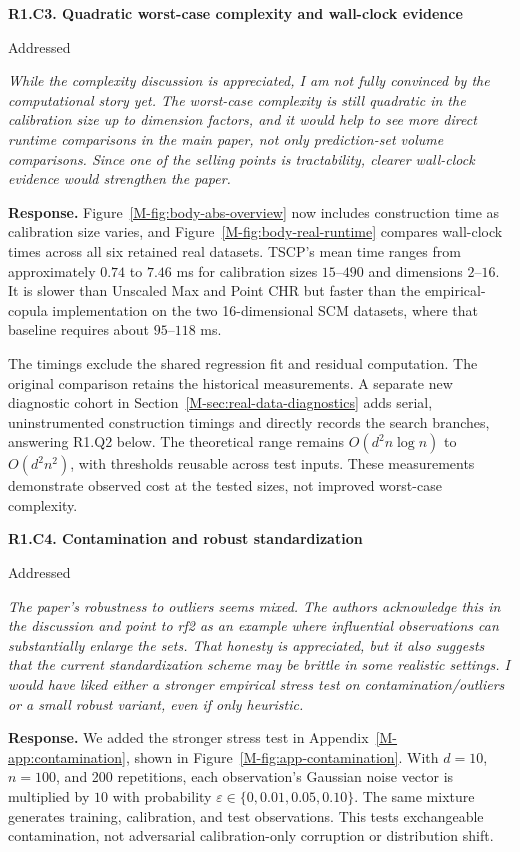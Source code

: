 \documentclass[11pt]{article}
\newcommand{\mssec}[1]{Section~\ref*{M-#1}}
\newcommand{\msapp}[1]{Appendix~\ref*{M-#1}}
\newcommand{\msfig}[1]{Figure~\ref*{M-#1}}
\newcommand{\point}[3]{\par\Needspace{7\baselineskip}\medskip
\noindent\parbox[t]{0.77\linewidth}{\textbf{#1}}\hfill
\parbox[t]{0.21\linewidth}{\raggedleft\small\sffamily #2}\par\nopagebreak
{\color{ReviewerBlue}\small\itshape #3\par}\textbf{Response.} }
\begin{document}
\point{R1.C3. Quadratic worst-case complexity and wall-clock evidence}{Addressed}{While the complexity discussion is appreciated, I am not fully convinced
by the computational story yet. The worst-case complexity is still
quadratic in the calibration size up to dimension factors, and it would
help to see more direct runtime comparisons in the main paper, not only
prediction-set volume comparisons. Since one of the selling points is
tractability, clearer wall-clock evidence would strengthen the paper.}
\label{response:R1.C3}
\msfig{fig:body-abs-overview} now includes construction time as calibration size varies, and \msfig{fig:body-real-runtime} compares wall-clock times across all six retained real datasets. TSCP's mean time ranges from approximately $0.74$ to $7.46$ ms for calibration sizes $15$--$490$ and dimensions $2$--$16$. It is slower than Unscaled Max and Point CHR but faster than the empirical-copula implementation on the two 16-dimensional SCM datasets, where that baseline requires about $95$--$118$ ms.

The timings exclude the shared regression fit and residual computation. The original comparison retains the historical measurements. A separate new diagnostic cohort in \mssec{sec:real-data-diagnostics} adds serial, uninstrumented construction timings and directly records the search branches, answering R1.Q2 below. The theoretical range remains $O(d^2n\log n)$ to $O(d^2n^2)$, with thresholds reusable across test inputs. These measurements demonstrate observed cost at the tested sizes, not improved worst-case complexity.

\point{R1.C4. Contamination and robust standardization}{Addressed}{The paper's robustness to outliers seems mixed. The authors acknowledge
this in the discussion and point to rf2 as an example where influential
observations can substantially enlarge the sets. That honesty is
appreciated, but it also suggests that the current standardization
scheme may be brittle in some realistic settings. I would have liked
either a stronger empirical stress test on contamination/outliers or a
small robust variant, even if only heuristic.}
\label{response:R1.C4}
We added the stronger stress test in \msapp{app:contamination}, shown in \msfig{fig:app-contamination}. With $d=10$, $n=100$, and 200 repetitions, each observation's Gaussian noise vector is multiplied by $10$ with probability $\varepsilon\in\{0,0.01,0.05,0.10\}$. The same mixture generates training, calibration, and test observations. This tests exchangeable contamination, not adversarial calibration-only corruption or distribution shift.
\end{document}
